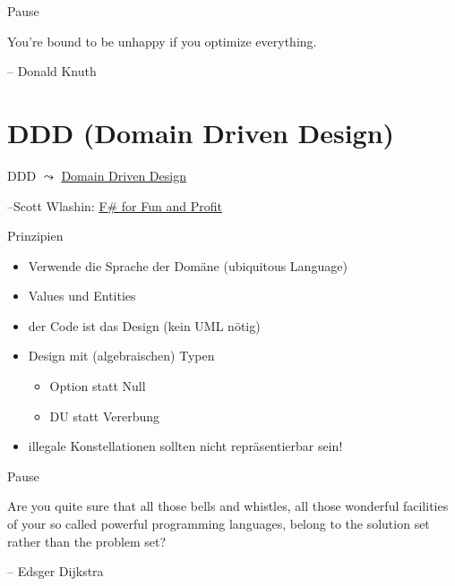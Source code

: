 \documentclass[t]{beamer}
\begin{document}
\begin{frame}[label={sec:orged8d30e}]{Pause}
\begin{block}{}
You’re bound to be unhappy if you optimize everything.

\null\hfill -- Donald Knuth
\end{block}
\end{frame}


\section{DDD (Domain Driven Design) }
\label{sec:orgd76e0cd}
\begin{frame}[label={sec:orga360aa5}]{DDD}
\(\leadsto\) \href{./4.1 Dmmf.pdf}{Domain Driven Design}

\null\hfill--Scott Wlashin: \href{https://fsharpforfunandprofit.com/series/designing-with-types/}{F\# for Fun and Profit}
\end{frame}


\begin{frame}[label={sec:org2c006f4}]{Prinzipien}
\begin{itemize}
\item Verwende die Sprache der Domäne (ubiquitous Language)
\item Values und Entities
\item der Code ist das Design (kein UML nötig)
\item Design mit (algebraischen) Typen
\begin{itemize}
\item Option statt Null
\item DU statt Vererbung
\end{itemize}
\item illegale Konstellationen sollten nicht repräsentierbar sein!
\end{itemize}
\end{frame}

\begin{frame}[label={sec:orgb0e50eb}]{Pause}
\begin{block}{}
Are you quite sure that all those bells and whistles, all those wonderful facilities of your so called powerful programming languages, belong to the solution set rather than the problem set?

\null\hfill -- Edsger Dijkstra
\end{block}
\end{frame}
\end{document}
